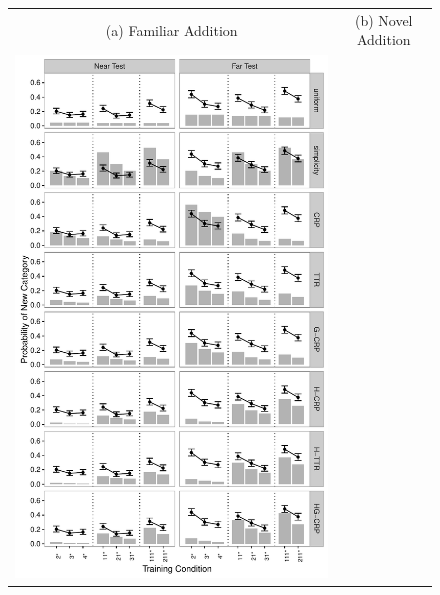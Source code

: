 \documentclass[doc]{apa6}
\begin{document}
\begin{figure}[t]
\begin{center}
\begin{tabular}{cc}
\footnotesize
\textsf{(a) Familiar Addition} &\footnotesize \textsf{(b) Novel Addition} \\
\includegraphics[scale=.5]{expt4fa.pdf} &

\end{tabular}
\end{center}
\end{figure}
\end{document}

